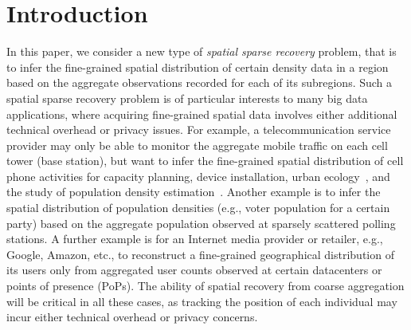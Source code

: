 \section{Introduction}
\label{sec:intro}

In this paper, we consider a new type of \emph{spatial sparse recovery} problem, that is to infer the fine-grained spatial distribution of certain density data in a region based on the aggregate observations recorded for each of its subregions. Such a spatial sparse recovery problem is of particular interests to many big data applications, where acquiring fine-grained spatial data involves either additional technical overhead or privacy issues. For example, a telecommunication service provider may only be able to monitor the aggregate mobile traffic on each cell tower (base station), but want to infer the fine-grained spatial distribution of cell phone activities for capacity planning, device installation, urban ecology~\cite{bcici_mobihoc15}, and the study of population density estimation~\cite{douglass2015high}. Another example is to infer the spatial distribution of population densities (e.g., voter population for a certain party) based on the aggregate population observed at sparsely scattered polling stations. A further example is for an Internet media provider or retailer, e.g., Google, Amazon, etc., to reconstruct a fine-grained geographical distribution of its users only from aggregated user counts observed at certain datacenters or points of presence (PoPs). The ability of spatial recovery from coarse aggregation will be critical in all these cases, as tracking the position of each individual may incur either technical overhead or privacy concerns.

